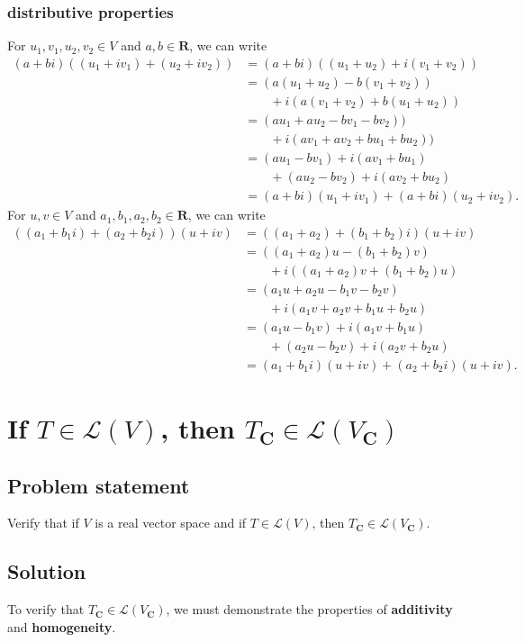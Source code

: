 \documentclass{article}
\begin{document}
\subsubsection*{distributive properties}
For $u_1,v_1,u_2,v_2\in V$ and $a,b\in\mathbf{R}$, we can write
\begin{align*}
    (a+bi)((u_1+iv_1)+(u_2+iv_2))&=(a+bi)((u_1+u_2)+i(v_1+v_2))\\
    &=(a(u_1+u_2)-b(v_1+v_2))\\
    &\qquad+i(a(v_1+v_2) + b(u_1+u_2))\\
    &=(au_1+au_2-bv_1-bv_2))\\
    &\qquad+i(av_1+av_2 + bu_1+bu_2))\\
    &=(au_1-bv_1)+i(av_1+bu_1)\\
    &\qquad+(au_2-bv_2)+i(av_2+bu_2)\\
    &=(a+bi)(u_1+iv_1)+(a+bi)(u_2+iv_2).
\end{align*}
For $u,v\in V$ and $a_1,b_1,a_2,b_2\in\mathbf{R}$, we can write
\begin{align*}
    ((a_1+b_1i)+(a_2+b_2i))(u+iv)&=((a_1+a_2)+(b_1+b_2)i)(u+iv)\\
    &=((a_1+a_2)u-(b_1+b_2)v)\\
    &\qquad+i((a_1+a_2)v+(b_1+b_2)u)\\
    &=(a_1u+a_2u-b_1v-b_2v)\\
    &\qquad+i(a_1v+a_2v+b_1u+b_2u)\\
    &=(a_1u-b_1v)+i(a_1v+b_1u)\\
    &\qquad+(a_2u-b_2v)+i(a_2v+b_2u)\\
    &=(a_1+b_1i)(u+iv)+(a_2+b_2i)(u+iv).
\end{align*}

\clearpage

\section{If $T\in\mathcal{L}(V)$, then $T_{\mathbf{C}}\in\mathcal{L}(V_{\mathbf{C}})$}
\subsection*{Problem statement}
Verify that if $V$ is a real vector space and if $T\in\mathcal{L}(V)$, then $T_{\mathbf{C}}\in\mathcal{L}(V_{\mathbf{C}})$.

\subsection*{Solution}
To verify that $T_{\mathbf{C}}\in\mathcal{L}(V_{\mathbf{C}})$, we must demonstrate the properties of \textbf{additivity} and \textbf{homogeneity}.
\end{document}
